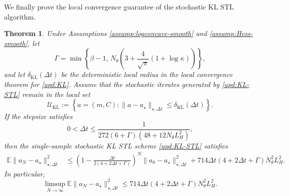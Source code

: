 \documentclass[11pt]{article}
\theoremstyle{plain}
\newtheorem{theorem}{Theorem}[section]
\theoremstyle{definition}
\theoremstyle{remark}
\newcommand{\E}{\mathbb{E}}
\begin{document}
We finally prove the local convergence guarantee of the stochastic KL STL algorithm.

\begin{theorem}\label{thm:loc-stoch-KL-STL}
    Under Assumptions \ref{assump:logconcave-smooth} and \ref{assump:Hess-smooth}, let
    \begin{equation*}
        \Gamma
        =
        \min\left\{
            \beta-1,\,
            N_\theta\left(3+\frac{4}{\sqrt{\pi}}(1+\log\kappa)\right)
        \right\},
    \end{equation*}
    and let $\delta_{\mathrm{KL}}(\Delta t)$ be the deterministic local radius in the local convergence theorem for \eqref{upd:KL}. Assume that the stochastic iterates generated by \eqref{upd:KL-STL} remain in the local set
    \begin{equation*}
        \mathcal{U}_{\mathrm{KL}}
        :=
        \left\{
            a=(m,C):
            \|a-a_\star\|_{\star,\Delta t}\leq \delta_{\mathrm{KL}}(\Delta t)
        \right\}.
    \end{equation*}
    If the stepsize satisfies
    \begin{equation*}
        0<\Delta t
        \leq
        \frac{1}{
            272(6+\Gamma)(48+12N_\theta L_H^2)
        },
    \end{equation*}
    then the single-sample stochastic KL STL scheme \eqref{upd:KL-STL} satisfies
    \begin{align*}
        \E\|a_N-a_\star\|_{\star,\Delta t}^2
        &\leq
        \left(
            1-\frac{\Delta t}{2(4+2\Delta t+\Gamma)}
        \right)^N
        \|a_0-a_\star\|_{\star,\Delta t}^2 +
        714\Delta t(4+2\Delta t+\Gamma)N_\theta^2L_H^2.
    \end{align*}
    In particular,
    \begin{equation*}
        \limsup_{N\to\infty}
        \E\|a_N-a_\star\|_{\star,\Delta t}^2
        \leq
        714\Delta t(4+2\Delta t+\Gamma)N_\theta^2L_H^2.
    \end{equation*}
\end{theorem}
\end{document}
